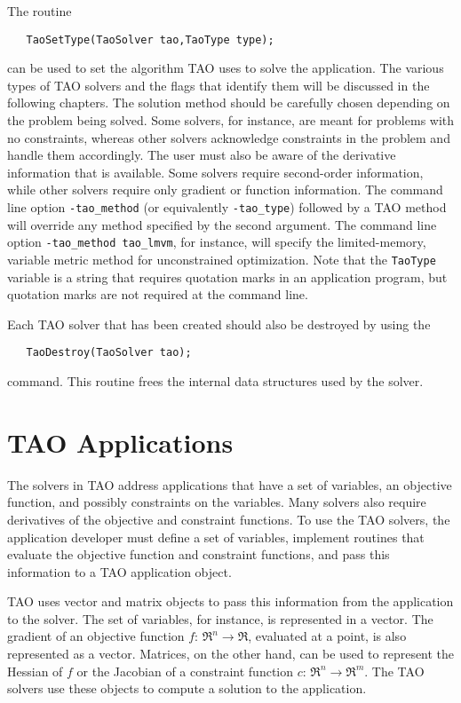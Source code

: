 The routine
\begin{verbatim}
   TaoSetType(TaoSolver tao,TaoType type);
\end{verbatim}
\noindent
can be used to set the algorithm TAO uses to solve the application.
The various types of TAO solvers and the flags that identify them 
will be discussed in the following chapters.
The solution method should be carefully chosen depending on
the problem being solved.  Some solvers, for instance, are meant for
problems with no constraints, whereas other solvers acknowledge constraints
in the problem and handle them accordingly.
The user must also be aware of the derivative information that is available.
Some solvers require second-order information, while other solvers require
only gradient or function information.
The command line option \texttt{-tao\_method} (or equivalently 
\texttt{-tao\_type}) followed by a TAO method
will override any method specified by the second argument.
The command line option {\tt -tao\_method tao\_lmvm}, for instance,
will specify the limited-memory, variable metric method for unconstrained
optimization.  Note that the {\tt TaoType} variable is a string that requires
quotation marks in an application program, but quotation marks are not required
at the command line.

Each TAO solver that has been created should also be destroyed by using
the  
\begin{verbatim}
   TaoDestroy(TaoSolver tao);
\end{verbatim}
command. 
This routine frees the internal data structures used by the solver.


\section{TAO Applications}
\label{section:taoapplication}
\label{section:petscapp}

The solvers in TAO address applications that have a set of variables, an objective
function, and possibly constraints on the variables.  Many solvers also
require derivatives
of the objective and constraint functions.
To use the TAO solvers, the application developer must 
define a set of variables, implement routines that evaluate the 
objective function and constraint functions, and pass this information
to a TAO application object.   

TAO uses vector and matrix objects to pass this information from the
application to the solver.   The set of variables, for instance, is
represented in a vector.
The gradient of an objective function $f: \, \Re^n \to \Re$,
evaluated at a point, is also represented as a vector.
Matrices,  on the other hand,
can be used to represent the Hessian of $f$ or the Jacobian of a constraint
function $c: \, \Re^n \to \Re^m$.  The TAO solvers use
these objects to compute a solution to the application.

